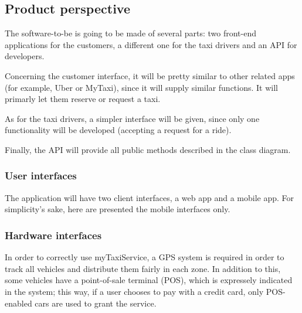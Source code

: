 \pagebreak
\subsection{Product perspective}

The software-to-be is going to be made of several parts: two front-end applications for the customers, a different one for the taxi drivers and an API for developers. 

Concerning the customer interface, it will be pretty similar to other related apps (for example, Uber or MyTaxi), since it will supply similar functions. It will primarly let them reserve or request a taxi.

As for the taxi drivers, a simpler interface will be given, since only one functionality will be developed (accepting a request for a ride).

Finally, the API will provide all public methods described in the class diagram. 
 
\subsubsection{User interfaces}
The application will have two client interfaces, a web app and a mobile app. For simplicity's sake, here are presented the mobile interfaces only.

\pagebreak
{}





\pagebreak
\subsubsection{Hardware interfaces}
In order to correctly use myTaxiService, a GPS system is required in order to track all vehicles and distribute them fairly in each zone. In addition to this, some vehicles have a point-of-sale terminal (POS), which is expressely indicated in the system; this way, if a user chooses to pay with a credit card, only POS-enabled cars are used to grant the service.

